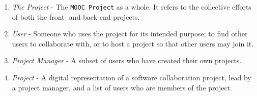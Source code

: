 \documentclass[a4paper, 12pt]{article}
\newcommand{\projectTitle}{\texttt{MOOC Project} }
\begin{document}
	\begin{enumerate}
		\item \emph{The Project} - The \projectTitle as a whole. It refers to the collective efforts of both the front- and back-end projects.

		\item \emph{User} - Someone who uses the project for its intended purpose; to find other users to collaborate with, or to host a project so that other users may join it.

		\item \emph{Project Manager} - A subset of users who have created their own projects.

		\item \emph{Project} - A digital representation of a software collaboration project, lead by a project manager, and a list of users who are members of the project.

	\end{enumerate}
\end{document}
